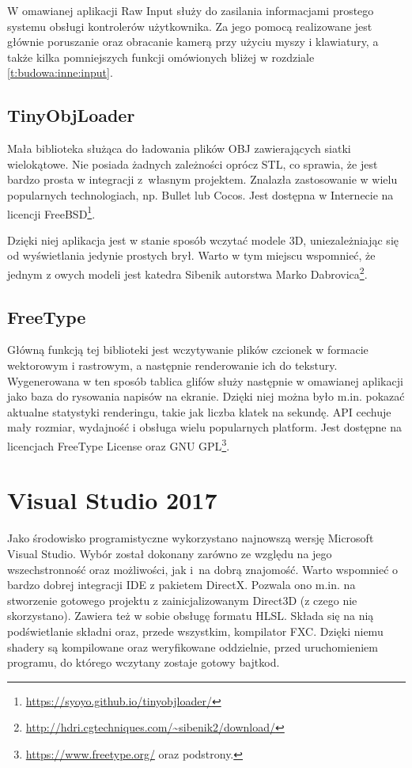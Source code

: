 		W omawianej aplikacji Raw Input służy do zasilania informacjami prostego systemu obsługi kontrolerów użytkownika. Za jego pomocą realizowane jest głównie poruszanie oraz obracanie kamerą przy użyciu myszy i klawiatury, a także kilka pomniejszych funkcji omówionych bliżej w rozdziale \ref{t:budowa:inne:input}.
		
		\subsection{TinyObjLoader}
		\label{t:technologie:helpers:obj}
		
		Mała biblioteka służąca do ładowania plików OBJ zawierających siatki wielokątowe. Nie posiada żadnych zależności oprócz STL, co sprawia, że jest bardzo prosta w integracji z~własnym projektem. Znalazła zastosowanie w wielu popularnych technologiach, np. Bullet lub Cocos. Jest dostępna w Internecie na licencji FreeBSD\footnote{\url{https://syoyo.github.io/tinyobjloader/}}.
		
		Dzięki niej aplikacja jest w stanie sposób wczytać modele 3D, uniezależniając się od wyświetlania jedynie prostych brył. Warto w tym miejscu wspomnieć, że jednym z owych modeli jest katedra Sibenik autorstwa Marko Dabrovica\footnote{\url{http://hdri.cgtechniques.com/~sibenik2/download/}}.
		
		\subsection{FreeType}
		\label{t:technologie:helpers:freetype}
		
		Główną funkcją tej biblioteki jest wczytywanie plików czcionek w formacie wektorowym i rastrowym, a następnie renderowanie ich do tekstury. Wygenerowana w ten sposób tablica glifów służy następnie w omawianej aplikacji jako baza do rysowania napisów na ekranie. Dzięki niej można było m.in. pokazać aktualne statystyki renderingu, takie jak liczba klatek na sekundę. API cechuje mały rozmiar, wydajność i obsługa wielu popularnych platform. Jest dostępne na licencjach FreeType License oraz GNU GPL\footnote{\url{https://www.freetype.org/} oraz podstrony.}.
	
	\section{Visual Studio 2017}
	\label{t:technologie:vs}
	
	Jako środowisko programistyczne wykorzystano najnowszą wersję Microsoft Visual Studio. Wybór został dokonany zarówno ze względu na jego wszechstronność oraz możliwości, jak i~na dobrą znajomość. Warto wspomnieć o bardzo dobrej integracji IDE z pakietem DirectX. Pozwala ono m.in. na stworzenie gotowego projektu z zainicjalizowanym Direct3D (z czego nie skorzystano). Zawiera też w sobie obsługę formatu HLSL. Składa się na nią podświetlanie składni oraz, przede wszystkim, kompilator FXC. Dzięki niemu shadery są kompilowane oraz weryfikowane oddzielnie, przed uruchomieniem programu, do którego wczytany zostaje gotowy bajtkod.
	
